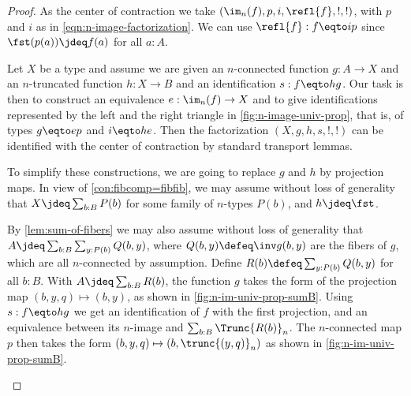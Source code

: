 \begin{proof}
As the center of contraction we take $(\im_n(f),p,i,\refl{f},!,!)$,
with $p$ and $i$ as in \cref{eqn:n-image-factorization}.
We can use $\refl{f} : f \eqto ip$ since $\fst(p(a))\jdeq f(a)$ for all $a:A$.

Let $X$ be a type and assume we are given an $n$-connected
function $g:A\to X$ and an $n$-truncated function $h:X\to B$
and an identification $s:f\eqto hg$. Our task is
then to construct an equivalence $e: \im_n(f)\to X$
and to give identifications represented by the left
and the right triangle in \cref{fig:n-image-univ-prop},
that is, of types $g\eqto ep$ and $i\eqto he$.
Then the factorization $(X,g,h,s,!,!)$ can be identified
with the center of contraction by standard transport lemmas.

\begin{marginfigure}
\noindent{}
\caption{Visualization of task to construct $e$.}
\label{fig:n-image-univ-prop}
\end{marginfigure}

To simplify these constructions,
we are going to replace $g$ and $h$ by projection maps.
In view of \cref{con:fibcomp=fibfib}, we may assume without
loss of generality that $X\jdeq \sum_{b:B} P(b)$ for some
family of $n$-types $P(b)$, and $h\jdeq\fst$.

By \cref{lem:sum-of-fibers} we may also assume without
loss of generality that
$A\jdeq\sum_{b:B}\sum_{y:P(b)} Q(b,y)$, where
$Q(b,y) \defeq\inv g (b,y)$ are the fibers of $g$,
which are all $n$-connected by assumption.
Define $R(b)\defeq\sum_{y:P(b)} Q(b,y)$ for all $b:B$.
With $A\jdeq \sum_{b:B} R(b)$, the function $g$
takes the form of the projection map $(b,y,q)\mapsto(b,y)$,
as shown in \cref{fig:n-im-univ-prop-sumB}.
Using $s: f\eqto hg$ we get an identification of $f$ with the first projection,
and an equivalence between its $n$-image and $\sum_{b:B} \Trunc{R(b)}_n$.
The $n$-connected map $p$ then takes the form
$(b,y,q)\mapsto(b,\trunc{(y,q)}_n)$ as shown in
\cref{fig:n-im-univ-prop-sumB}.

\begin{marginfigure}
  \noindent{}
\caption{Visualization of task to construct $e$, reinterpreted.}
\label{fig:n-im-univ-prop-sumB}
\end{marginfigure}



\end{proof}
